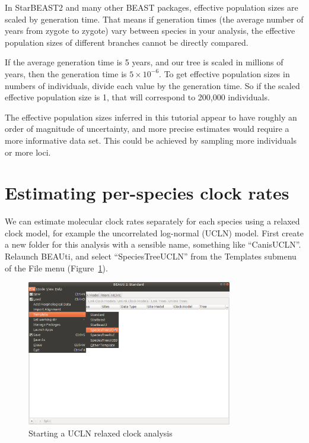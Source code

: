 \documentclass[12pt]{article}
\begin{document}
\newpage{}

In StarBEAST2 and many other BEAST packages, effective population sizes are
scaled by generation time. That means if generation times (the average
number of years from zygote to zygote) vary between species in your
analysis, the effective population sizes of different branches cannot be
directly compared.

If the average generation time is 5 years, and our tree is scaled in millions
of years, then the generation time is $5\times10^{-6}$. To get effective
population sizes in numbers of individuals, divide each value by the
generation time. So if the scaled effective population size is 1, that
will correspond to 200,000 individuals.

The effective population sizes inferred in this tutorial appear to have
roughly an order of magnitude of uncertainty, and more precise estimates would require
a more informative data set. This could be achieved by sampling more
individuals or more loci.

\clearpage{}

\section{Estimating per-species clock rates}
\label{sec:relaxedClock}

We can estimate molecular clock rates separately for each species using
a relaxed clock model, for example the uncorrelated log-normal (UCLN) model.
First create a new folder for this analysis with a sensible name, something
like ``CanisUCLN''. Relaunch BEAUti, and select ``SpeciesTreeUCLN'' from the
Templates submenu of the File menu (Figure~\ref{fig:speciesTreeUCLN}).

\begin{figure}[htb!]
\centering
\includegraphics[width=0.8\textwidth]{figures/speciesTreeUCLN.png}
\caption
{Starting a UCLN relaxed clock analysis}
\label{fig:speciesTreeUCLN}
\end{figure}
\end{document}
